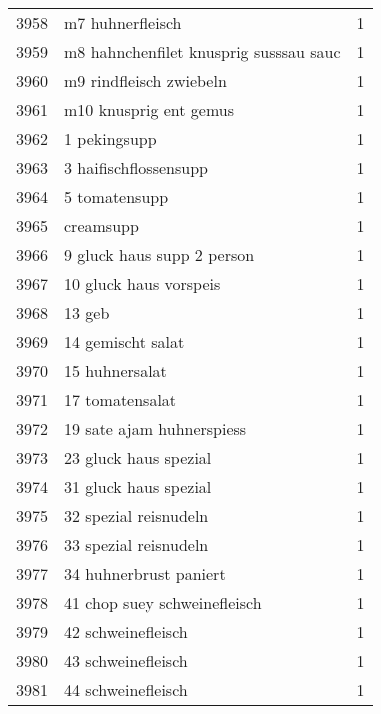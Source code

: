 \begin{tabular}{llr}
3958 &                                   m7 huhnerfleisch &      1 \\
3959 &             m8 hahnchenfilet knusprig susssau sauc &      1 \\
3960 &                            m9 rindfleisch zwiebeln &      1 \\
3961 &                             m10 knusprig ent gemus &      1 \\
3962 &                                       1 pekingsupp &      1 \\
3963 &                              3 haifischflossensupp &      1 \\
3964 &                                      5 tomatensupp &      1 \\
3965 &                                          creamsupp &      1 \\
3966 &                         9 gluck haus supp 2 person &      1 \\
3967 &                             10 gluck haus vorspeis &      1 \\
3968 &                                             13 geb &      1 \\
3969 &                                  14 gemischt salat &      1 \\
3970 &                                     15 huhnersalat &      1 \\
3971 &                                    17 tomatensalat &      1 \\
3972 &                          19 sate ajam huhnerspiess &      1 \\
3973 &                              23 gluck haus spezial &      1 \\
3974 &                              31 gluck haus spezial &      1 \\
3975 &                              32 spezial reisnudeln &      1 \\
3976 &                              33 spezial reisnudeln &      1 \\
3977 &                             34 huhnerbrust paniert &      1 \\
3978 &                       41 chop suey schweinefleisch &      1 \\
3979 &                                 42 schweinefleisch &      1 \\
3980 &                                 43 schweinefleisch &      1 \\
3981 &                                 44 schweinefleisch &      1 \\

\end{tabular}
